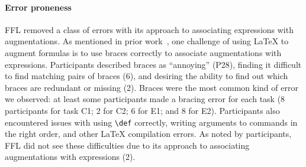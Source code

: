 



\paragraph{Error proneness}

FFL removed a class of errors with its approach to associating expressions with augmentations. As mentioned in prior work~\cite{ref:head2022math}, one challenge of using LaTeX to augment formulas is to use braces correctly to associate augmentations with expressions. Participants described braces as ``annoying'' (P28), finding it difficult to find matching pairs of braces (6), and desiring the ability to find out which braces are redundant or missing (2). Braces were the most common kind of error we observed: at least some participants made a bracing error for each task (8 participants for task C1; 2 for C2; 6 for E1; and 8 for E2). Participants also encountered issues with using \texttt{\textbackslash{}def} correctly, writing arguments to commands in the right order, and other LaTeX compilation errors. As noted by participants, FFL did not see these difficulties due to its approach to associating augmentations with expressions (2).

